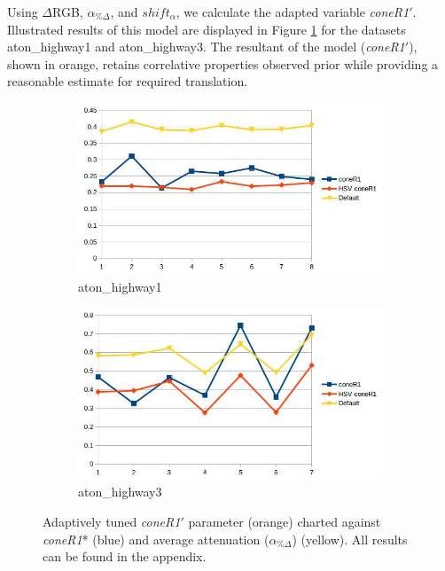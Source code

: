Using $\Delta$RGB, $\alpha_{\%\Delta}$, and $shift_{\alpha}$, we calculate the adapted variable \textit{coneR1}$'$. Illustrated results of this model are displayed in Figure \ref{fig:new_coneR1} for the datasets aton\_highway1 and aton\_highway3. The resultant of the model (\textit{coneR1}$'$), shown in orange, retains correlative properties observed prior while providing a reasonable estimate for required translation.

\begin{figure}
  \centering
  \begin{subfigure}{1\linewidth}
  \includegraphics[width=1\linewidth]{figures/model/highway1_calc_coneR1.jpg}
  \caption{aton\_highway1}
\end{subfigure}
\hfill
\begin{subfigure}{1\linewidth}
  \includegraphics[width=1\linewidth]{figures/model/highway3_calc_coneR1.jpg}
  \caption{aton\_highway3}
\end{subfigure}

\caption{Adaptively tuned \textit{coneR1}$'$ parameter (orange) charted against \textit{coneR1}* (blue) and average attenuation ($\alpha_{\%\Delta}$) (yellow). All results can be found in the appendix.}
\label{fig:new_coneR1}
\end{figure}

